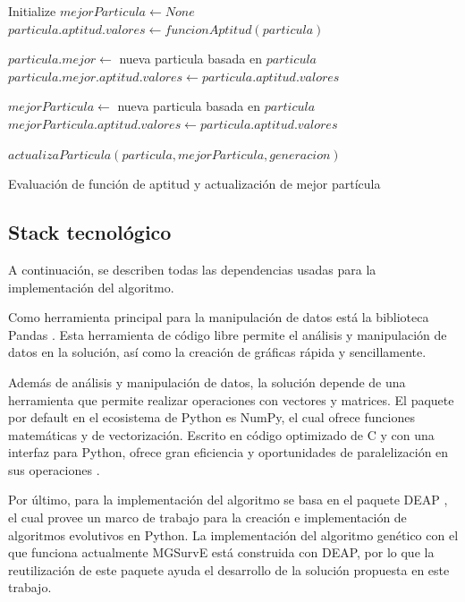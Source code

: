   \begin{algorithm}[ht!]
    \begin{algorithmic}
      \State Initialize $mejorParticula \gets None$
          \State $particula.aptitud.valores \gets funcionAptitud(particula)$

            \State $particula.mejor \gets$ nueva particula basada en $particula$
            \State $particula.mejor.aptitud.valores \gets particula.aptitud.valores$
          \EndIf

            \State $mejorParticula \gets$ nueva particula basada en $particula$
            \State $mejorParticula.aptitud.valores \gets particula.aptitud.valores$
          \EndIf
        \EndFor 

          \State $actualizaParticula(particula, mejorParticula, generacion)$
        \EndFor
      \EndFor
      \caption{Evaluación de función de aptitud y actualización de mejor
        partícula}
      \label{alg:pso-variant-eval}
    \end{algorithmic}
  \end{algorithm}

  \subsection{Stack tecnológico}
  A continuación, se describen todas las dependencias usadas para la
  implementación del algoritmo.

  Como herramienta principal para la manipulación de datos está la biblioteca
  Pandas \cite{PandasDocs}. Esta herramienta de código libre permite el
  análisis y manipulación de datos en la solución, así como la creación de
  gráficas rápida y sencillamente.

  Además de análisis y manipulación de datos, la solución depende de una
  herramienta que permite realizar operaciones con vectores y matrices. El
  paquete por default en el ecosistema de Python es NumPy, el cual ofrece
  funciones matemáticas y de vectorización. Escrito en código optimizado de C
  y con una interfaz para Python, ofrece gran eficiencia y oportunidades de 
  paralelización en sus operaciones \cite{NumPyDocs}.

  Por último, para la implementación del algoritmo se basa en el paquete DEAP
  \cite{DEAPDocs}, el cual provee un marco de trabajo para la creación e
  implementación de algoritmos evolutivos en Python. La implementación del
  algoritmo genético con el que funciona actualmente MGSurvE está construida
  con DEAP, por lo que la reutilización de este paquete ayuda el desarrollo de
  la solución propuesta en este trabajo.

